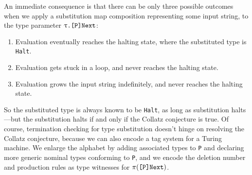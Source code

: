 \documentclass[../generics]{subfiles}
\begin{document}
An immediate consequence is that there can be only three possible outcomes when we apply a substitution map composition representing some input string, to the type parameter $\texttt{$\uptau$.[P]Next}$:
\begin{enumerate}
\item Evaluation eventually reaches the halting state, where the substituted type is \texttt{Halt}.
\item Evaluation gets stuck in a loop, and never reaches the halting state.
\item Evaluation grows the input string indefinitely, and never reaches the halting state.
\end{enumerate}
So the substituted type is always known to be \texttt{Halt}, as long as substitution halts---but the substitution halts if and only if the Collatz conjecture is true. Of course, termination checking for type substitution doesn't hinge on resolving the Collatz conjecture, because  we can also encode a tag system for a Turing machine. We enlarge the alphabet by adding associated types to \texttt{P} and declaring more generic nominal types conforming to \texttt{P}, and we encode the deletion number and production rules as type witnesses for $\pi(\texttt{[P]Next})$. 

\eject
\end{document}
